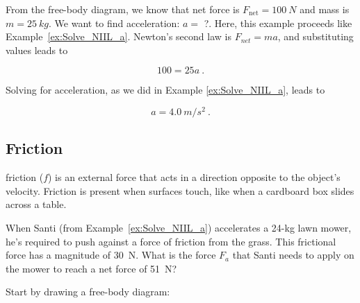 \documentclass[main.tex]{subfiles}
\begin{document}
\Solution From the free-body diagram, we know that net force is $F_{\text{net}} = \SI{100}{N}$ and mass is $m = \SI{25}{kg}$. We want to find acceleration: $a =$ ?. Here, this example proceeds like Example~\ref{ex:Solve_NIIL_a}. Newton's second law is $F_{net} = ma$, and substituting values leads to

\begin{equation*}
    100 = 25 a\ .
\end{equation*}

Solving for acceleration, as we did in Example \ref{ex:Solve_NIIL_a}, leads to

\begin{equation*}
    a = \SI{4.0}{m/s^2}\ .
\end{equation*}

\vspace{2ex}

\cyanhrule


\subsection{Friction} \label{lk8L5k}

\Gls{friction} ($f$) is an external force that acts in a direction opposite to the object's velocity. Friction is present when surfaces touch, like when a cardboard box slides across a table.

\begin{example}
When Santi (from Example~\ref{ex:Solve_NIIL_a}) accelerates a 24-kg lawn mower, he's required to push against a force of friction from the grass. This frictional force has a magnitude of \SI{30}{N}. What is the force $F_a$ that Santi needs to apply on the mower to reach a net force of \SI{51}{N}?
\end{example}

\Solution Start by drawing a free-body diagram:

\begin{center}

\end{center}
\end{document}
